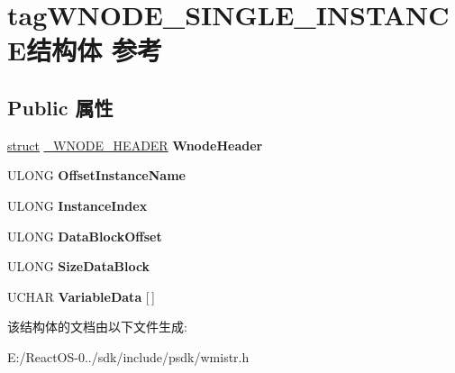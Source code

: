 \hypertarget{structtag_w_n_o_d_e___s_i_n_g_l_e___i_n_s_t_a_n_c_e}{}\section{tag\+W\+N\+O\+D\+E\+\_\+\+S\+I\+N\+G\+L\+E\+\_\+\+I\+N\+S\+T\+A\+N\+C\+E结构体 参考}
\label{structtag_w_n_o_d_e___s_i_n_g_l_e___i_n_s_t_a_n_c_e}
\subsection*{Public 属性}
\begin{DoxyCompactItemize}
\item 
\mbox{\label{structtag_w_n_o_d_e___s_i_n_g_l_e___i_n_s_t_a_n_c_e_a8ee58bdf58d87fdc87354113870ad5a9}} 
\hyperlink{interfacestruct}{struct} \hyperlink{struct___w_n_o_d_e___h_e_a_d_e_r}{\+\_\+\+W\+N\+O\+D\+E\+\_\+\+H\+E\+A\+D\+ER} {\bfseries Wnode\+Header}
\item 
\mbox{\label{structtag_w_n_o_d_e___s_i_n_g_l_e___i_n_s_t_a_n_c_e_aa8ab5dadbfc1c10625b534c0ecf369a2}} 
U\+L\+O\+NG {\bfseries Offset\+Instance\+Name}
\item 
\mbox{\label{structtag_w_n_o_d_e___s_i_n_g_l_e___i_n_s_t_a_n_c_e_aaa3ce2691cea719de862812be534a17d}} 
U\+L\+O\+NG {\bfseries Instance\+Index}
\item 
\mbox{\label{structtag_w_n_o_d_e___s_i_n_g_l_e___i_n_s_t_a_n_c_e_af68c8a739ebffad1ed229f2a49cdac20}} 
U\+L\+O\+NG {\bfseries Data\+Block\+Offset}
\item 
\mbox{\label{structtag_w_n_o_d_e___s_i_n_g_l_e___i_n_s_t_a_n_c_e_a44814b7ac7b6f9939d448df76f2f4fd5}} 
U\+L\+O\+NG {\bfseries Size\+Data\+Block}
\item 
\mbox{\label{structtag_w_n_o_d_e___s_i_n_g_l_e___i_n_s_t_a_n_c_e_ae010388d6ffa75eca000904a25965037}} 
U\+C\+H\+AR {\bfseries Variable\+Data} \mbox{[}$\,$\mbox{]}
\end{DoxyCompactItemize}


该结构体的文档由以下文件生成\+:\begin{DoxyCompactItemize}
\item 
E\+:/\+React\+O\+S-\/0../sdk/include/psdk/wmistr.\+h\end{DoxyCompactItemize}
